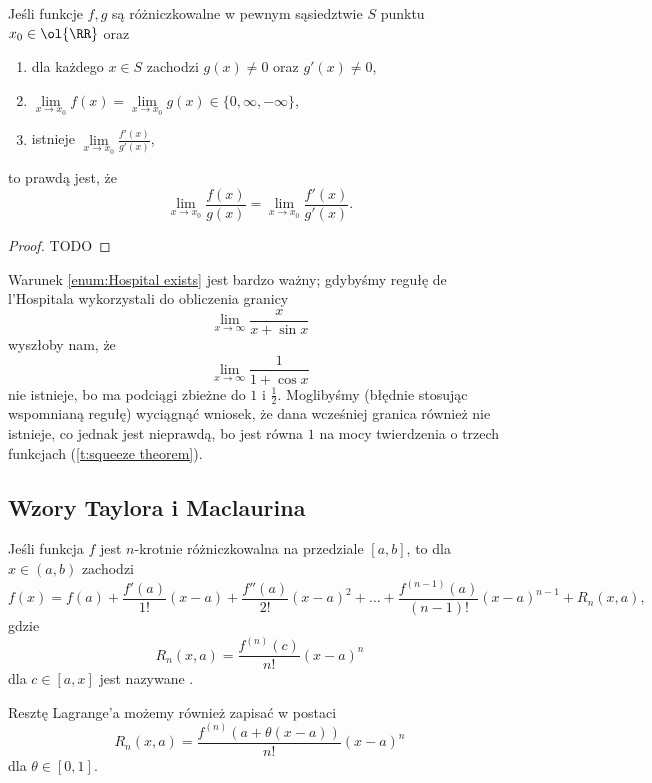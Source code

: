\begin{theorem}
    \label{t:Hospital}
    Jeśli funkcje $f, g$ są różniczkowalne w pewnym sąsiedztwie $S$ punktu $x_0 \in \ol{\RR}$ oraz
    \begin{enumerate}
        \item dla każdego $x \in S$ zachodzi $g(x) \neq 0$ oraz $g'(x) \neq 0$,
        \item $\lim\limits_{x\to x_0} f(x) = \lim\limits_{x\to x_0} g(x) \in \{0, \infty, -\infty\}$,
        \item \label{enum:Hospital exists} istnieje $\lim\limits_{x\to x_0}\frac{f'(x)}{g'(x)}$,
    \end{enumerate}
    to prawdą jest, że
    \[ \lim_{x\to x_0}\frac{f(x)}{g(x)} = \lim_{x\to x_0}\frac{f'(x)}{g'(x)}. \]
\end{theorem}
\begin{proof}
    TODO
\end{proof}
\begin{remark}
    Warunek \ref{enum:Hospital exists} jest bardzo ważny; gdybyśmy regułę de l'Hospitala wykorzystali do obliczenia granicy
    \[ \lim_{x\to\infty}\frac{x}{x + \sin x} \]
    wyszłoby nam, że
    \[ \lim_{x\to\infty}\frac{1}{1 + \cos x} \]
    nie istnieje, bo ma podciągi zbieżne do $1$ i $\frac{1}{2}$. Moglibyśmy (błędnie stosując wspomnianą regułę) wyciągnąć wniosek, że dana wcześniej granica również nie istnieje, co jednak jest nieprawdą, bo jest równa $1$ na mocy twierdzenia o trzech funkcjach (\ref{t:squeeze theorem}).
\end{remark}

\subsection{Wzory Taylora i Maclaurina}
\begin{theorem}[Taylora]
    \label{t:Taylor}
    Jeśli funkcja $f$ jest $n$-krotnie różniczkowalna na przedziale $[a, b]$, to dla $x \in (a, b)$ zachodzi
    \[ f(x) = f(a) + \frac{f'(a)}{1!}(x - a) + \frac{f''(a)}{2!}(x - a)^2 + \ldots + \frac{f^{(n-1)}(a)}{(n-1)!}(x - a)^{n-1} + R_n(x, a), \]
    gdzie
    \[ R_n(x, a) = \frac{f^{(n)}(c)}{n!}(x - a)^n \]
    dla $c \in [a, x]$ jest nazywane .
\end{theorem}

Resztę Lagrange'a możemy również zapisać w postaci
\[ R_n(x, a) = \frac{f^{(n)}(a + \theta(x - a))}{n!}(x - a)^n \]
dla $\theta \in [0, 1]$.

